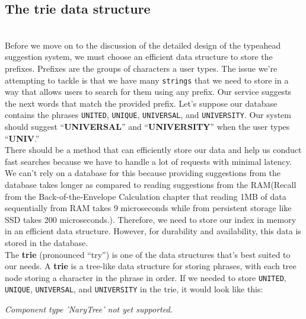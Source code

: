

\subsection{The trie data structure}\label{dMh6ps7y0_jMdxesk5mCX}
\\
Before we move on to the discussion of the detailed design of the typeahead suggestion system, we must choose an efficient data structure to store the prefixes. Prefixes are the groups of characters a user types. The issue we're attempting to tackle is that we have many \texttt{strings} that we need to store in a way that allows users to search for them using any prefix. Our service suggests the next words that match the provided prefix. Let's suppose our database contains the phrases \texttt{UNITED}, \texttt{UNIQUE}, \texttt{UNIVERSAL}, and \texttt{UNIVERSITY}. Our system should suggest ``\textbf{UNIVERSAL}'' and ``\textbf{UNIVERSITY}'' when the user types ``\textbf{UNIV}.''
\\
There should be a method that can efficiently store our data and help us conduct fast searches because we have to handle a lot of requests with minimal latency. We can't rely on a database for this because providing suggestions from the database takes longer as compared to reading suggestions from the RAM(Recall from the Back-of-the-Envelope Calculation chapter that reading 1MB of data sequentially from RAM takes 9 microseconds while from persistent storage like SSD takes 200 microseconds.). Therefore, we need to store our index in memory in an efficient data structure. However, for durability and availability, this data is stored in the database.
\\
The \textbf{trie} (pronounced ``try'') is one of the data structures that's best suited to our needs. A \textbf{trie} is a tree-like data structure for storing phrases, with each tree node storing a character in the phrase in order. If we needed to store \texttt{UNITED}, \texttt{UNIQUE}, \texttt{UNIVERSAL}, and \texttt{UNIVERSITY} in the trie, it would look like this:

\textit{Component type 'NaryTree' not yet supported.}


